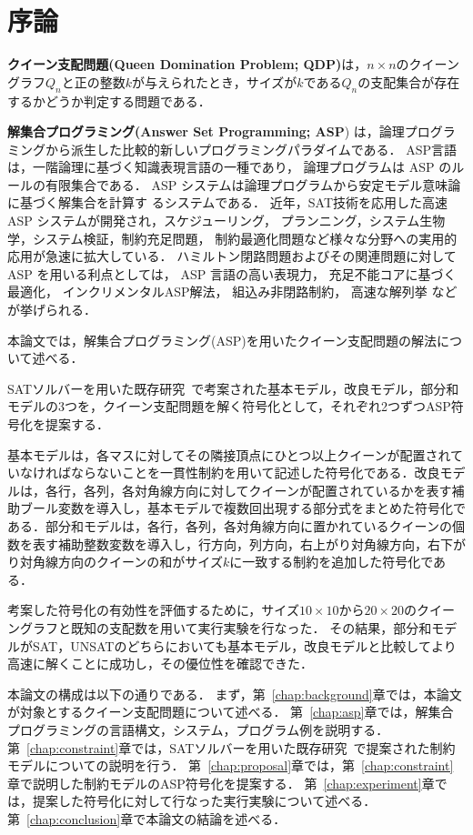 \chapter{序論}\label{chap:introduction}

\textbf{クイーン支配問題(Queen Domination Problem; QDP)}は，$n \times n$のクイーングラフ$Q_{n}$と正の整数$k$が与えられたとき，サイズが$k$である$Q_{n}$の支配集合が存在するかどうか判定する問題である．

\textbf{解集合プログラミング(Answer Set Programming; ASP}\cite{%
  Baral03:cambridge,%
  Gelfond88:iclp,%
  Inoue08:jssst,%
  Niemela99:amai})
は，論理プログラミングから派生した比較的新しいプログラミングパラダイムである．
ASP言語は，一階論理に基づく知識表現言語の一種であり，
論理プログラムは ASP のルールの有限集合である．
ASP システムは論理プログラムから安定モデル意味論に基づく解集合を計算す
るシステムである．
近年，SAT技術を応用した高速 ASP システムが開発され，スケジューリング，
プランニング，システム生物学，システム検証，制約充足問題，
制約最適化問題など様々な分野への実用的応用が急速に拡大している．
ハミルトン閉路問題およびその関連問題に対して ASP を用いる利点としては，
ASP 言語の高い表現力，
充足不能コアに基づく最適化，
インクリメンタルASP解法，
組込み非閉路制約，
高速な解列挙
などが挙げられる．

本論文では，解集合プログラミング(ASP)を用いたクイーン支配問題の解法について述べる．

SATソルバーを用いた既存研究~\cite{yamamoto21}で考案された基本モデル，改良モデル，部分和モデルの3つを，クイーン支配問題を解く符号化として，それぞれ2つずつASP符号化を提案する．

基本モデルは，各マスに対してその隣接頂点にひとつ以上クイーンが配置されていなければならないことを一貫性制約を用いて記述した符号化である．改良モデルは，各行，各列，各対角線方向に対してクイーンが配置されているかを表す補助ブール変数を導入し，基本モデルで複数回出現する部分式をまとめた符号化である．部分和モデルは，各行，各列，各対角線方向に置かれているクイーンの個数を表す補助整数変数を導入し，行方向，列方向，右上がり対角線方向，右下がり対角線方向のクイーンの和がサイズ$k$に一致する制約を追加した符号化である．

考案した符号化の有効性を評価するために，サイズ$10 \times 10$から$20 \times 20$のクイーングラフと既知の支配数を用いて実行実験を行なった．
その結果，部分和モデルがSAT，UNSATのどちらにおいても基本モデル，改良モデルと比較してより高速に解くことに成功し，その優位性を確認できた．

本論文の構成は以下の通りである．
まず，第~\ref{chap:background}章では，本論文が対象とするクイーン支配問題について述べる．
第~\ref{chap:asp}章では，解集合プログラミングの言語構文，システム，プログラム例を説明する．
第~\ref{chap:constraint}章では，SATソルバーを用いた既存研究~\cite{yamamoto21}で提案された制約モデルについての説明を行う．
第~\ref{chap:proposal}章では，第~\ref{chap:constraint}章で説明した制約モデルのASP符号化を提案する．
第~\ref{chap:experiment}章では，提案した符号化に対して行なった実行実験について述べる．
第~\ref{chap:conclusion}章で本論文の結論を述べる．

